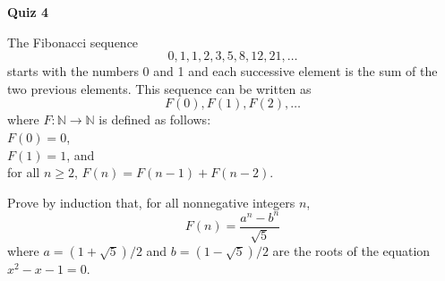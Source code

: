 \documentclass[11pt]{article}
\def\nats{{\mathbb N}}
\begin{document}
{\bf \large Quiz 4}

\begin{question}
The Fibonacci sequence
$$0,1,1,2,3,5,8,12,21, \ldots$$
starts with the numbers 0 and 1 and each successive element is the sum of the two previous elements.
This sequence can be written as
$$F(0), F(1), F(2), \ldots$$
where
$F:\nats \rightarrow \nats$ is defined
as follows:\\
$F(0) = 0$,\\
$F(1) = 1$, and\\
for all $n \geq 2$, $F(n) = F(n-1) + F(n-2)$.


Prove by induction that,  for all nonnegative integers $n$,
$$F(n)  = \frac{a^n -b^n}{\sqrt{5}}$$
where $a = (1+\sqrt{5})/2$ and $b = (1-\sqrt{5})/2$ are the roots of the equation $x^2 - x -1 =0$.\\
\end{question}
\end{document}
